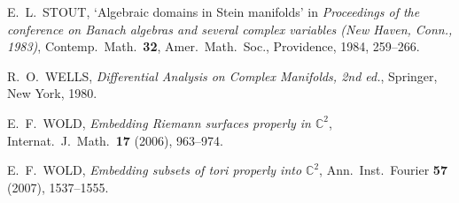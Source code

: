 \documentclass[11pt]{amsart}
\numberwithin{equation}{section}
\theoremstyle{definition}
\begin{document}
\begin{thebibliography}{10}
E.\ L.\ STOUT, 
`Algebraic domains in Stein manifolds' in 
\textit{Proceedings of the conference on Banach algebras and several complex 
variables (New Haven, Conn., 1983)},  
Contemp.\ Math.\ \textbf{32}, Amer.\ Math.\ Soc., 
Providence, 1984, 259--266.
 
R.\ O.\ WELLS, 
\textit{Differential Analysis on Complex Manifolds, 2nd ed.},
Springer, New York, 1980.

E.\ F.\ WOLD, 
\textit{Embedding Riemann surfaces properly in ${\mathbb{C}}^2$},
Internat.\ J.\ Math.\ \textbf{17} (2006), 963--974.

E.\ F.\ WOLD, 
\textit{Embedding subsets of tori properly into ${\mathbb{C}}^2$},
Ann.\ Inst.\ Fourier \textbf{57} (2007), 1537--1555.

\end{thebibliography}
\end{document}
